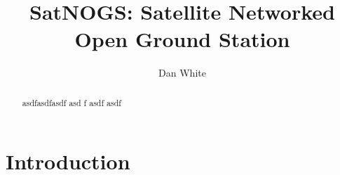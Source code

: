 \documentclass{article}
\title{SatNOGS: Satellite Networked Open Ground Station}
\author{Dan White}
\begin{document}
\maketitle

\begin{abstract}
asdfasdfasdf
asd
f
asdf
asdf
\end{abstract}

\section{Introduction}

\section{}
\end{document}
